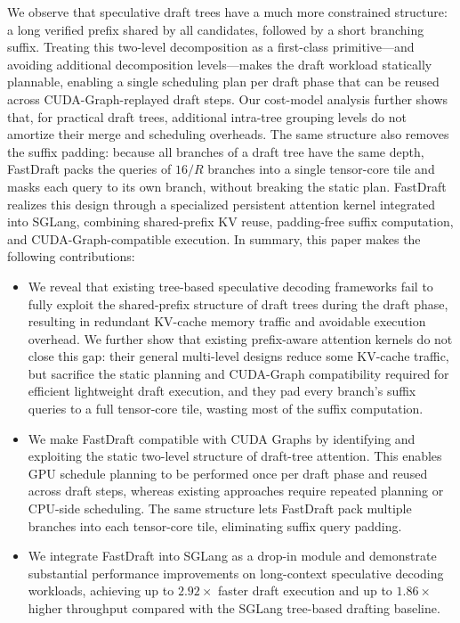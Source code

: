 \documentclass{article}
\begin{document}
We observe that speculative draft trees have a much more constrained structure: a long verified prefix shared by all candidates, followed by a short branching suffix. Treating this two-level decomposition as a first-class primitive---and avoiding additional decomposition levels---makes the draft workload statically plannable, enabling a single scheduling plan per draft phase that can be reused across CUDA-Graph-replayed draft steps. Our cost-model analysis further shows that, for practical draft trees, additional intra-tree grouping levels do not amortize their merge and scheduling overheads. The same structure also removes the suffix padding: because all branches of a draft tree have the same depth, FastDraft packs the queries of $16/R$ branches into a single tensor-core tile and masks each query to its own branch, without breaking the static plan. FastDraft realizes this design through a specialized persistent attention kernel integrated into SGLang, combining shared-prefix KV reuse, padding-free suffix computation, and CUDA-Graph-compatible execution.
In summary, this paper makes the following contributions:
\begin{itemize}
    \item We reveal that existing tree-based speculative decoding frameworks fail to fully exploit the shared-prefix structure of draft trees during the draft phase, resulting in redundant KV-cache memory traffic and avoidable execution overhead. We further show that existing prefix-aware attention kernels do not close this gap: their general multi-level designs reduce some KV-cache traffic, but sacrifice the static planning and CUDA-Graph compatibility required for efficient lightweight draft execution, and they pad every branch's suffix queries to a full tensor-core tile, wasting most of the suffix computation.

    \item We make FastDraft compatible with CUDA Graphs by identifying and exploiting the static two-level structure of draft-tree attention. This enables GPU schedule planning to be performed once per draft phase and reused across draft steps, whereas existing approaches require repeated planning or CPU-side scheduling. The same structure lets FastDraft pack multiple branches into each tensor-core tile, eliminating suffix query padding.

    \item We integrate FastDraft into SGLang as a drop-in module and demonstrate substantial performance improvements on long-context speculative decoding workloads, achieving up to $2.92\times$ faster draft execution and up to $1.86\times$ higher throughput compared with the SGLang tree-based drafting baseline.
\end{itemize}
\end{document}
